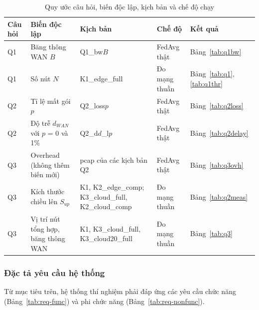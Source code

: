 \begin{table}[H]
    \centering
    \caption{Quy ước câu hỏi, biến độc lập, kịch bản và chế độ chạy}
    \label{tab:qmap}
    \small
    \begin{tabularx}{\textwidth}{l >{\raggedright\arraybackslash}X >{\raggedright\arraybackslash}X l l}
        \toprule
        \textbf{Câu hỏi} & \textbf{Biến độc lập} & \textbf{Kịch bản} & \textbf{Chế độ} & \textbf{Kết quả} \\
        \midrule
        Q1 & Băng thông WAN $B$ & Q1\_bw$B$ & FedAvg thật & Bảng~\ref{tab:q1bw} \\
        Q1 & Số nút $N$ & K1\_edge\_full & Đo mạng thuần & Bảng~\ref{tab:q1}, \ref{tab:q1thr} \\
        \midrule
        Q2 & Tỉ lệ mất gói $p$ & Q2\_loss$p$ & FedAvg thật & Bảng~\ref{tab:q2loss} \\
        Q2 & Độ trễ $d_{WAN}$ với $p$ = 0 và 1\% & Q2\_d$d$\_l$p$ & FedAvg thật & Bảng~\ref{tab:q2delay} \\
        \midrule
        Q3 & Overhead (không thêm biến mới) & pcap của các kịch bản Q2 & FedAvg thật & Bảng~\ref{tab:q3ovh} \\
        Q3 & Kích thước chiều lên $S_{up}$ & K1, K2\_edge\_comp; K3\_cloud\_full, K2\_cloud\_comp & Đo mạng thuần & Bảng~\ref{tab:q2meas} \\
        Q3 & Vị trí nút tổng hợp, băng thông WAN & K1, K3\_cloud\_full, K3\_cloud20\_full & Đo mạng thuần & Bảng~\ref{tab:q3} \\
        \bottomrule
    \end{tabularx}
\end{table}

\subsubsection{Đặc tả yêu cầu hệ thống}
Từ mục tiêu trên, hệ thống thí nghiệm phải đáp ứng các yêu cầu chức năng (Bảng~\ref{tab:req-func}) và phi chức năng (Bảng~\ref{tab:req-nonfunc}).


